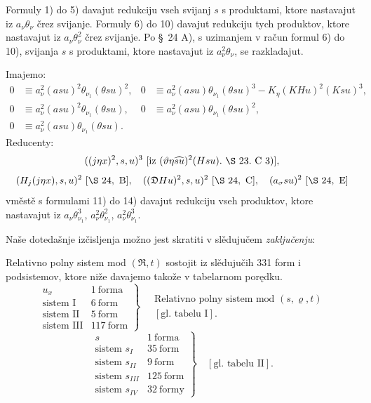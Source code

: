 \documentclass[11pt]{article}
\newcommand{\R}{\mathfrak R}
\newcommand{\D}{\mathfrak D}
\begin{document}
Formuly 1) do 5) davajut redukciju vseh svijanj $s$ s produktami, ktore nastavajut iz $a_\nu\theta_\nu$ črez svijanje. Formuly 6) do 10) davajut redukciju tych produktov, ktore nastavajut iz $a_\nu\theta_\nu^2$ črez svijanje. Po \S\ 24 \mbox{A)}, s uzimanjem v račun formul 6) do 10), svijanja $s$ s produktami, ktore nastavajut iz $a_\nu^2\theta_\nu$, se razkladajut.

Imajemo:
\begin{align*}
0&\equiv a_\nu^2(asu)^2\theta_{\nu_1}(\theta su)^2,
&0&\equiv a_\nu^2(asu)\theta_{\nu_1}(\theta su)^3-K_\eta(KHu)^2(Ksu)^3,\\
0&\equiv a_\nu^2(asu)^2\theta_{\nu_1}(\theta su),
&0&\equiv a_\nu^2(asu)\theta_{\nu_1}(\theta su)^2,\\
0&\equiv a_\nu^2(asu)\theta_{\nu_1}(\theta su).
\end{align*}
Reducenty:
\[
 ((j\eta x)^2,s,u)^3\ [\hbox{iz }(\vartheta\eta\widehat{su})^2(Hsu).\ \S\ 23.\ \mbox{C\ 3})],
\]
\[
(H_j(j\eta x),s,u)^2\ [\S\ 24,\ \mbox{B}],
\quad ((\D Hu)^2,s,u)^2\ [\S\ 24,\ \mbox{C}],
\quad (a_\sigma su)^2\ [\S\ 24,\ \mbox{E}]
\]
vměstě s formulami 11) do 14) davajut redukciju vseh produktov, ktore nastavajut iz $a_\nu\theta_{\nu_1}^3$, $a_\nu^2\theta_{\nu_1}^2$, $a_\nu^2\theta_{\nu_1}^3$.

Naše dotedašnje izčisljenja možno jest skratiti v slědujučem \textit{zaključenju}:

Relativno polny sistem mod $(\R,t)$ sostojit iz slědujučih 331 form i podsistemov, ktore niže davajemo takože v tabelarnom porędku.
\[
\left.
\begin{array}{lr}
u_x&1\ \text{forma}\\
\text{sistem I}&6\ \text{form}\\
\text{sistem II}&5\ \text{form}\\
\text{sistem III}&117\ \text{form}
\end{array}
\right\}
\quad
\begin{gathered}
\text{Relativno polny sistem mod }(s,\varrho,t)\\
{}[\text{gl. tabelu I}].
\end{gathered}
\]
\[
\left.
\begin{array}{lr}
s&1\ \text{forma}\\
\text{sistem }s_I&35\ \text{form}\\
\text{sistem }s_{II}&9\ \text{form}\\
\text{sistem }s_{III}&125\ \text{form}\\
\text{sistem }s_{IV}&32\ \text{formy}
\end{array}
\right\}
\quad [\text{gl. tabelu II}].
\]
\end{document}
